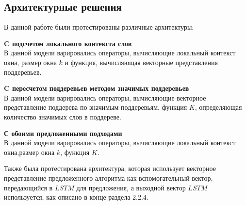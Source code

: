 \subsection{Архитектурные решения}
В данной работе были протестированы различные архитектуры:

\textbf{C подсчетом локального контекста слов}\\
В данной модели варировались операторы, вычисляющие локальный контекст окна, размер окна $k$ и функция, вычисляющая векторные представления поддеревьев.

\textbf{C пересчетом поддеревьев методом значимых поддеревьев}\\
В данной модели варировались операторы, вычисляющие векторное представление поддерева по значимым поддеревьям, функция $K$, определяющая количество значимых слов в поддереве.

\textbf{С обоими предложенными подходами}\\
В данной модели варировались операторы, вычисляющие локальный контекст окна,размер окна $k$, функция $K$.

\vspace{5mm}
Также была протестирована архитектура, которая использует векторное представление предложенного алгоритма как вспомогательный вектор, передающийся в $LSTM$ для предложения, а выходной вектор $LSTM$ используется, как описано в конце раздела 2.2.4.